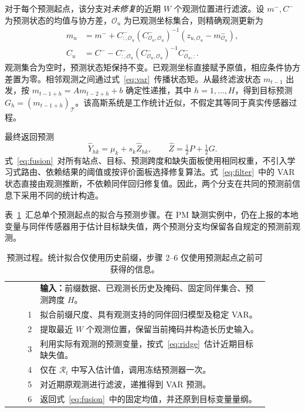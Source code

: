 对于每个预测起点，该分支对\emph{未修复}的近期 $W$ 个观测位置进行滤波。设 $m^-,C^-$ 为预测状态的均值与协方差，$\mathcal O_u$ 为已观测坐标集合，则精确观测更新为
\begin{align}
 m_u&=m^-+C^-_{:,\mathcal O_u}(C^-_{\mathcal O_u,\mathcal O_u})^{-1}
          (z_{u,\mathcal O_u}-m^-_{\mathcal O_u}),\nonumber\\
 C_u&=C^- - C^-_{:,\mathcal O_u}(C^-_{\mathcal O_u,\mathcal O_u})^{-1}C^-_{\mathcal O_u,:}.
 \label{eq:filter}
\end{align}
观测集合为空时，预测状态矩保持不变。已观测坐标直接赋予原值，相应条件协方差置为零。相邻观测之间通过式~\eqref{eq:var}~传播状态矩。从最终滤波状态 $m_{t-1}$ 出发，按 $m_{t-1+h}=Am_{t-2+h}+b$ 确定性递推，其中 $h=1,\ldots,H$，得到目标预测 $G_h=(m_{t-1+h})_{\mathcal T}$。该高斯系统是工作统计近似，不假定其等同于真实传感器过程。

最终返回预测
\begin{equation}
 \widehat Y_{hk}=\mu_k+s_k\widehat Z_{hk},\qquad
 \widehat Z=\tfrac12P+\tfrac12G.
 \label{eq:fusion}
\end{equation}
式~\eqref{eq:fusion}~对所有站点、目标、预测跨度和缺失面板使用相同权重，不引入学习式路由、依赖结果的阈值或按评价面板选择修复算法。式~\eqref{eq:filter}~中的 VAR 状态直接由观测推断，不依赖同伴回归修复值。因此，两个分支在共同的预测前信息下采用不同的统计构造。

表~\ref{alg:procedure}~汇总单个预测起点的拟合与预测步骤。在 PM 缺测实例中，仍在上报的本地变量与同伴传感器用于估计目标缺失值，两个预测分支均保留各自规定的预测前观测。

\begin{table}[t]
\caption{预测过程。统计拟合仅使用历史前缀，步骤 2--6 仅使用预测起点之前可获得的信息。}
\label{alg:procedure}
\centering\small
\begin{tabular}{r p{0.88\linewidth}}
\toprule
 & \textbf{输入：}前缀数据、已观测长历史及掩码、固定同伴集合、预测跨度 $H$。\\
1 & 拟合前缀尺度、具有观测支持的同伴回归模型及稳定 VAR。\\
2 & 提取最近 $W$ 个观测位置，保留当前掩码并构造长历史输入。\\
3 & 利用实际有观测的预测变量，按式~\eqref{eq:ridge}~估计近期目标缺失值。\\
4 & 仅在 $\mathcal R_t$ 中写入估计值，调用冻结预测器一次。\\
5 & 对近期原观测进行滤波，递推得到 VAR 预测。\\
6 & 返回式~\eqref{eq:fusion}~中的固定均值，并还原到目标变量量纲。\\
\bottomrule
\end{tabular}
\end{table}

